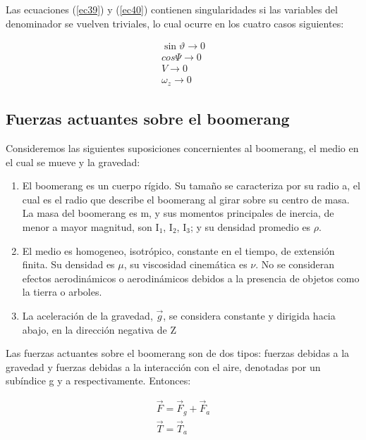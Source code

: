 	Las ecuaciones (\ref{ec39}) y (\ref{ec40})  contienen singularidades si las variables del denominador se vuelven triviales, lo cual ocurre en los cuatro casos siguientes:

		\begin{equation}
		\begin{matrix}
	    \sin{\vartheta\rightarrow}0\\
		cos{\Psi\rightarrow}0\\
		{V\rightarrow}0\\
		{{\omega}_{z}\rightarrow}0
		\end{matrix}
		\label{ec42}
		\end{equation}


	\subsection{Fuerzas actuantes sobre el boomerang}

	Consideremos las siguientes suposiciones concernientes al boomerang, el medio en el cual se mueve y la gravedad:

	\begin{enumerate}
	\item El boomerang es un cuerpo rígido. Su tamaño se caracteriza por su radio a, el cual es el radio que describe el boomerang al girar sobre su centro de masa. La masa del boomerang es m, y sus momentos principales de inercia, de menor a mayor magnitud, son I$_{1}$, I$_{2}$, I$_{3}$; y su densidad promedio es $\rho$.
	\item El medio es homogeneo, isotrópico, constante en el tiempo, de extensión finita. Su densidad es $\mu$, su viscosidad cinemática es $\nu$. No se consideran efectos aerodinámicos o aerodinámicos debidos a la presencia de objetos como la tierra o arboles.
	\item La aceleración de la gravedad, $\vec{g}$, se considera constante y dirigida hacia abajo, en la dirección negativa de Z
	\end{enumerate}

	Las fuerzas actuantes sobre el boomerang son de dos tipos: fuerzas debidas a la gravedad y fuerzas debidas a la interacción con el aire, denotadas por un subíndice g y a respectivamente. Entonces:

		\begin{subequations}
    	\begin{align}
	    \vec{F}={\vec{F}}_{g}+{\vec{F}}_{a}\\
    	\vec{T}={\vec{T}}_{a}
		\end{align}
		\label{ec43}
		\end{subequations}


